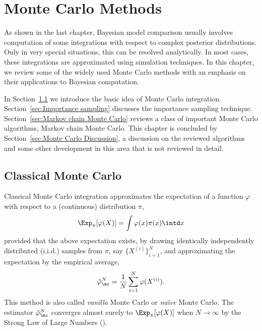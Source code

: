 \chapter{Monte Carlo Methods}
\label{cha:Monte Carlo Methods}

As shown in the last chapter, Bayesian model comparison usually involves
computation of some integrations with respect to complex posterior
distributions. Only in very special situations, this can be resolved
analytically. In most cases, these integrations are approximated using
simulation techniques. In this chapter, we review some of the widely used
Monte Carlo methods with an emphasis on their applications to Bayesian
computation.

In Section~\ref{sec:Classical Monte Carlo} we introduce the basic idea of
Monte Carlo integration. Section~\ref{sec:Importance sampling} discusses the
importance sampling technique. Section~\ref{sec:Markov chain Monte Carlo}
reviews a class of important Monte Carlo algorithms, Markov chain Monte Carlo.
This chapter is concluded by Section~\ref{sec:Monte Carlo Discussion}, a
discussion on the reviewed algorithms and some other development in this area
that is not reviewed in detail.

\section{Classical Monte Carlo}
\label{sec:Classical Monte Carlo}

Classical Monte Carlo integration approximates the expectation of a function
$\varphi$ with respect to a (continuous) distribution $\pi$,
\begin{equation*}
  \Exp_{\pi}[\varphi(X)] = \int\varphi(x)\pi(x)\intd x
\end{equation*}
provided that the above expectation exists, by drawing identically
independently distributed (i.i.d.) samples from
$\pi$, say $\{X^{(i)}\}_{i=1}^N$, and approximating the expectation by the
empirical average,
\begin{equation}
  \hat\varphi_{\mc}^N = \frac{1}{N}\sum_{i=1}^N\varphi(X^{(i)}).
  \label{eq:vanilla mc}
\end{equation}
This method is also called \emph{vanilla} Monte Carlo or \emph{na\"\i ve}
Monte Carlo. The estimator $\hat\varphi_{\mc}^N$ converges almost surely to
$\Exp_{\pi}[\varphi(X)]$ when $N\to\infty$ by the Strong Law of Large Numbers
(\slln).

